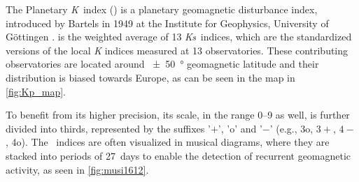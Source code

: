 The Planetary \textit{K}~index (\Kp{}) is a planetary geomagnetic disturbance index, introduced by Bartels in 1949 at the Institute for Geophysics, University of Göttingen \citep{Bartels1949}. \Kp{} is the weighted average of 13 \textit{Ks}~indices, which are the standardized versions of the local \textit{K} indices measured at 13 observatories. These contributing observatories are located around \SI{+-50}{\degree} geomagnetic latitude and their distribution is biased towards Europe, as can be seen in the map in \autoref{fig:Kp_map}.
\begin{figure}[htb]
\end{figure}
To benefit from its higher precision, its scale, in the range 0--9 as well, is further divided into thirds, represented by the suffixes '$+$', 'o' and '$-$' (e.g., 3o, $3+$, $4-$, 4o). The \Kp{}~indices are often visualized in musical diagrams, where they are stacked into periods of 27~days to enable the detection of recurrent geomagnetic activity, as seen in \autoref{fig:musi1612}.

